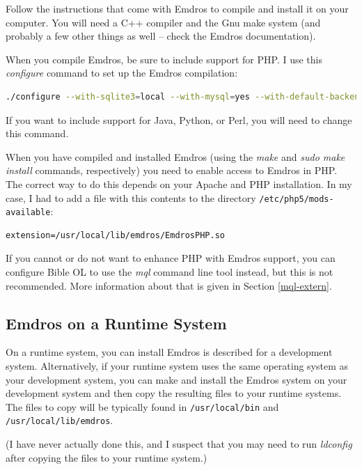 \documentclass[11pt,oneside,a4paper]{memoir}
\begin{document}
Follow the instructions that come with Emdros to compile and install it on your computer. You will
need a C++ compiler and the Gnu make system (and probably a few other things as well -- check the
Emdros documentation).

When you compile Emdros, be sure to include support for PHP. I use this \emph{configure} command to set up
the Emdros compilation:

\begin{lstlisting}[language=bash]
./configure --with-sqlite3=local --with-mysql=yes --with-default-backend=sqlite3 --with-swig-language-php=yes --with-swig-language-java=no --with-swig-language-python=no --with-swig-language-perl=no
\end{lstlisting}

If you want to include support for Java, Python, or Perl, you will need to change this command.

When you have compiled and installed Emdros (using the \emph{make} and \emph{sudo make install}
commands, respectively) you need to enable access to Emdros in PHP. The correct way to do this
depends on your Apache and PHP installation. In my case, I had to add a file with this contents to
the directory \texttt{/etc/php5/mods-available}:

\begin{lstlisting}
extension=/usr/local/lib/emdros/EmdrosPHP.so
\end{lstlisting}

If you cannot or do not want to enhance PHP with Emdros support, you can configure Bible OL to use
the \emph{mql} command line tool instead, but this is not recommended. More information about that
is given in Section \ref{mql-extern}.

\subsection{Emdros on a Runtime System}

On a runtime system, you can install Emdros is described for a development system. Alternatively, if
your runtime system uses the same operating system as your development system, you can make and
install the Emdros system on your development system and then copy the resulting files to your
runtime systems. The files to copy will be typically found in \texttt{/usr/local/bin} and
\texttt{/usr/local/lib/emdros}.

(I have never actually done this, and I suspect that you may need to run \emph{ldconfig} after
copying the files to your runtime system.)
\end{document}

